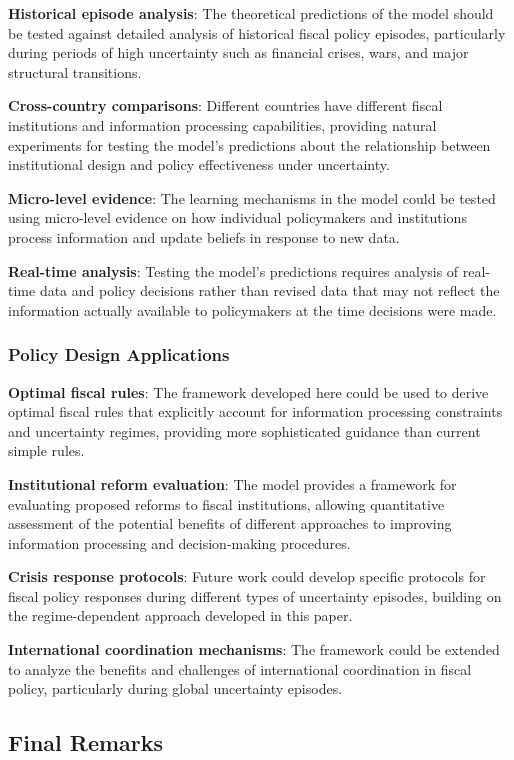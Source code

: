 \documentclass[5p,authoryear]{elsarticle}
\begin{document}
\textbf{Historical episode analysis}: The theoretical predictions of the model should be tested against detailed analysis of historical fiscal policy episodes, particularly during periods of high uncertainty such as financial crises, wars, and major structural transitions.

\textbf{Cross-country comparisons}: Different countries have different fiscal institutions and information processing capabilities, providing natural experiments for testing the model's predictions about the relationship between institutional design and policy effectiveness under uncertainty.

\textbf{Micro-level evidence}: The learning mechanisms in the model could be tested using micro-level evidence on how individual policymakers and institutions process information and update beliefs in response to new data.

\textbf{Real-time analysis}: Testing the model's predictions requires analysis of real-time data and policy decisions rather than revised data that may not reflect the information actually available to policymakers at the time decisions were made.

\subsubsection{Policy Design Applications}

\textbf{Optimal fiscal rules}: The framework developed here could be used to derive optimal fiscal rules that explicitly account for information processing constraints and uncertainty regimes, providing more sophisticated guidance than current simple rules.

\textbf{Institutional reform evaluation}: The model provides a framework for evaluating proposed reforms to fiscal institutions, allowing quantitative assessment of the potential benefits of different approaches to improving information processing and decision-making procedures.

\textbf{Crisis response protocols}: Future work could develop specific protocols for fiscal policy responses during different types of uncertainty episodes, building on the regime-dependent approach developed in this paper.

\textbf{International coordination mechanisms}: The framework could be extended to analyze the benefits and challenges of international coordination in fiscal policy, particularly during global uncertainty episodes.

\subsection{Final Remarks}
\end{document}
